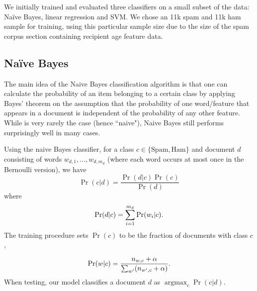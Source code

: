 \documentclass[preprint]{acm_proc_article-sp}
\DeclareMathOperator{\Argmax}{argmax}
\newcommand{\PosC}{\mathrm{Spam}}
\newcommand{\NegC}{\mathrm{Ham}}
\begin{document}
We initially trained and evaluated three classifiers on a small subset of the data: Na\"ive Bayes, linear regression and SVM. 
We chose an 11k spam and 11k ham sample for training, using this particular sample size due to the size of the spam corpus 
section containing recipient age feature data.  


\subsection{Na\"ive Bayes}

The main idea of the Naive Bayes classification algorithm is that one can calculate the probability 
of an item belonging to a certain class by applying Bayes' theorem on the assumption that the probability 
of one word/feature that appears in a document is independent of the probability of any other feature. 
While is very rarely the case (hence ``naive"), Naive Bayes still performs surprisingly well in many cases.
 
Using the naive Bayes classifier, for a class \(c \in \{\PosC, \NegC\}\) and document \(d\) consisting of words \(w_{d,1},\dotsc,w_{d,m_d}\) (where each word occurs at most once in the Bernoulli version), we have
\[\Pr(c|d)=\frac{\Pr(d|c)\Pr(c)}{\Pr(d)}\]
where
\[\Pr(d|c)=\sum_{i=1}^{m_d}\Pr(w_i|c)\ldotp\]
The training procedure sets \(\Pr(c)\) to be the fraction of documents with class \(c\),%

\[\Pr(w|c)=\frac{n_{w,c}+\alpha}{\sum_{w'}(n_{w',c}+\alpha)}\ldotp\]
When testing, our model classifies a document \(d\) as \(\Argmax_c\Pr(c|d)\).



%
%
\end{document}
